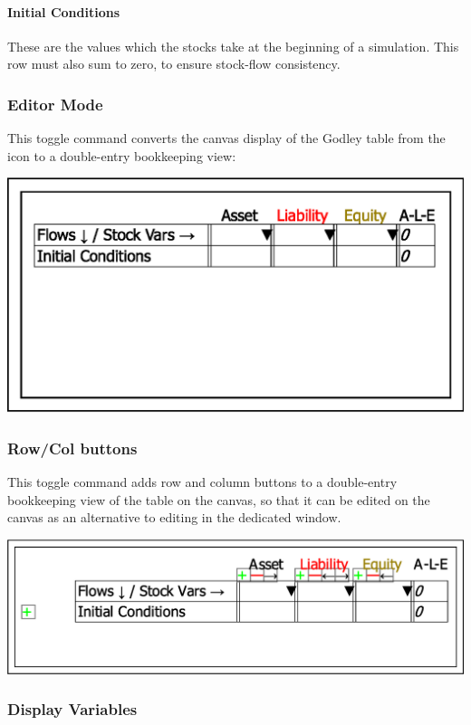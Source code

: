\paragraph{Initial Conditions}

These are the values which the stocks take at the beginning of a simulation.
This row must also sum to zero, to ensure stock-flow consistency.

\subsubsection{Editor Mode}

This toggle command converts the canvas display of the Godley table
from the icon to a double-entry bookkeeping view:

\includegraphics{images/GodleyTableEditMode}

\subsubsection{Row/Col buttons}

This toggle command adds row and column buttons to a double-entry
bookkeeping view of the table on the canvas, so that it can be edited
on the canvas as an alternative to editing in the dedicated window.

\includegraphics{images/GodleyTableEditModeButtons}

\subsubsection{Display Variables}


